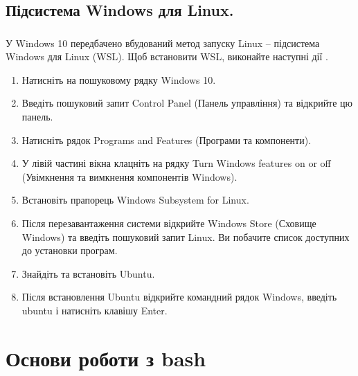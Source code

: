 \documentclass[t]{beamer}  %
\begin{document}
\subsection{ Підсистема Windows для Linux. }

\begin{frame}
	\frametitle{\insertsection} 
	\framesubtitle{\insertsubsection}
	   У Windows 10 передбачено вбудований метод запуску Linux -- підсистема Windows для Linux (WSL). Щоб встановити WSL, виконайте наступні дії .
		  {\scriptsize 
		  \begin{enumerate}
		    \item Натисніть на пошуковому рядку Windows 10.
		    \item Введіть пошуковий запит Control Panel (Панель управління) та відкрийте цю панель.
		    \item Натисніть рядок Programs and Features (Програми та компоненти).
		    \item У лівій частині вікна клацніть на рядку Turn Windows features on or off (Увімкнення та вимкнення компонентів Windows).
		    \item Встановіть прапорець Windows Subsystem for Linux.
		    \item Після перезавантаження системи відкрийте Windows Store (Сховище Windows) та введіть пошуковий запит Linux. Ви побачите список доступних до установки програм.
		    \item Знайдіть та встановіть Ubuntu.
		    \item Після встановлення Ubuntu відкрийте командний рядок Windows, введіть ubuntu і натисніть клавішу Enter.
		  \end{enumerate}
		  }
	
		 
\end{frame}

\section{Основи роботи з bash}
\end{document}
